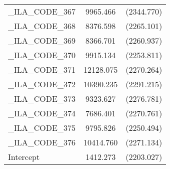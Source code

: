 {\begin{table}[htbp]
\begin{tabular}{l c c }
\_ILA\_CODE\_367  &  9965.466  & (2344.770)\\
\_ILA\_CODE\_368  &  8376.598  & (2265.101)\\
\_ILA\_CODE\_369  &  8366.701  & (2260.937)\\
\_ILA\_CODE\_370  &  9915.134  & (2253.811)\\
\_ILA\_CODE\_371  &  12128.075  & (2270.264)\\
\_ILA\_CODE\_372  &  10390.235  & (2291.215)\\
\_ILA\_CODE\_373  &  9323.627  & (2276.781)\\
\_ILA\_CODE\_374  &  7686.401  & (2270.761)\\
\_ILA\_CODE\_375  &  9795.826  & (2250.494)\\
\_ILA\_CODE\_376  &  10414.760  & (2271.134)\\
Intercept  &  1412.273  & (2203.027)\\
\hline\end{tabular}
\end{table}
}

